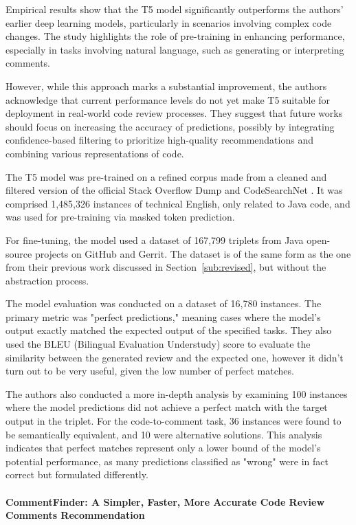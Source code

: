 Empirical results show that the T5 model significantly outperforms the authors'
earlier deep learning models, particularly in scenarios involving complex code
changes. The study highlights the role of pre-training in enhancing
performance, especially in tasks involving natural language, such as generating
or interpreting comments.

However, while this approach marks a substantial improvement, the authors
acknowledge that current performance levels do not yet make T5 suitable for
deployment in real-world code review processes. They suggest that future works
should focus on increasing the accuracy of predictions, possibly by integrating
confidence-based filtering to prioritize high-quality recommendations and
combining various representations of code.

The T5 model was pre-trained on a refined corpus made from a cleaned and
filtered version of the official Stack Overflow Dump \cite{so_dump} and
CodeSearchNet \cite{Java:CodeSearchNet}. It was comprised 1,485,326 instances
of technical English, only related to Java code, and was used for pre-training
via masked token prediction.

For fine-tuning, the model used a dataset of 167,799 triplets from Java
open-source projects on GitHub and Gerrit. The dataset is of the same form as
the one from their previous work \cite{tufano:icse2021} discussed in
Section~\ref{sub:revised}, but without the abstraction process.

The model evaluation was conducted on a dataset of 16,780 instances. The
primary metric was "perfect predictions," meaning cases where the model’s
output exactly matched the expected output of the specified tasks. They also
used the BLEU (Bilingual Evaluation Understudy) score \cite{papineni2002bleu}
to evaluate the similarity between the generated review and the expected one,
however it didn't turn out to be very useful, given the low number of perfect
matches.

The authors also conducted a more in-depth analysis by examining 100 instances
where the model predictions did not achieve a perfect match with the target
output in the triplet. For the code-to-comment task, 36 instances were found to
be semantically equivalent, and 10 were alternative solutions. This analysis
indicates that perfect matches represent only a lower bound of the model's
potential performance, as many predictions classified as "wrong" were in fact
correct but formulated differently.

\paragraph{CommentFinder: A Simpler, Faster, More Accurate Code Review Comments Recommendation}

